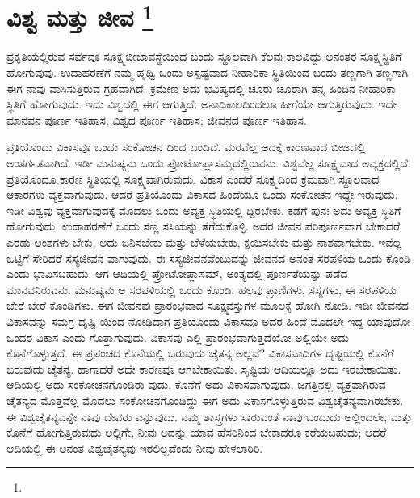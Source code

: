 
\chapter[ವಿಶ್ವ ಮತ್ತು ಜೀವ ]{ವಿಶ್ವ ಮತ್ತು ಜೀವ \protect\footnote{}}

ಪ್ರಕೃತಿಯಲ್ಲಿರುವ ಸರ್ವವೂ ಸೂಕ್ಷ್ಮಬೀಜಾವಸ್ಥೆಯಿಂದ ಬಂದು ಸ್ಥೂಲವಾಗಿ ಕೆಲವು ಕಾಲವಿದ್ದು ಅನಂತರ ಸೂಕ್ಷ್ಮಸ್ಥಿತಿಗೆ ಹೋಗುವುವು. ಉದಾಹರಣೆಗೆ ನಮ್ಮ ಪೃಥ್ವಿ ಒಂದು ಅಸ್ಪಷ್ಟವಾದ ನೀಹಾರಿಕಾ ಸ್ಥಿತಿಯಿಂದ ಬಂದು ತಣ್ಣಗಾಗಿ ತಣ್ಣಗಾಗಿ ಈಗ ನಾವು ವಾಸಿಸುತ್ತಿರುವ ಗ್ರಹವಾಗಿದೆ. ಕ್ರಮೇಣ ಅದು ಭವಿಷ್ಯದಲ್ಲಿ ಚೂರು ಚೂರಾಗಿ ತನ್ನ ಹಿಂದಿನ ನೀಹಾರಿಕಾ ಸ್ಥಿತಿಗೆ ಹೋಗುವುದು. ಇದು ವಿಶ್ವದಲ್ಲಿ ಈಗ ಆಗುತ್ತಿದೆ. ಅನಾದಿಕಾಲದಿಂದಲೂ ಹೀಗೆಯೇ ಆಗುತ್ತಿರುವುದು. ಇದೇ ಮಾನವನ ಪೂರ್ಣ ಇತಿಹಾಸ; ವಿಶ್ವದ ಪೂರ್ಣ ಇತಿಹಾಸ; ಜೀವನದ ಪೂರ್ಣ ಇತಿಹಾಸ.

ಪ್ರತಿಯೊಂದು ವಿಕಾಸವೂ ಒಂದು ಸಂಕೋಚನ  ದಿಂದ ಬಂದಿದೆ. ಮರವೆಲ್ಲ ಅದಕ್ಕೆ ಕಾರಣವಾದ ಬೀಜದಲ್ಲಿ ಅಂತರ್ಗತವಾಗಿದೆ. ಇಡೀ ಮನುಷ್ಯನು ಒಂದು ಪ್ರೋಟೋಪ್ಲಾಸಮ್ಮದಲ್ಲಿರುವನು. ವಿಶ್ವವೆಲ್ಲ ಸೂಕ್ಷ್ಮವಾದ ಅವ್ಯಕ್ತದಲ್ಲಿದೆ. ಪ್ರತಿಯೊಂದೂ ಕಾರಣ ಸ್ಥಿತಿಯಲ್ಲಿ ಸೂಕ್ಷ್ಮವಾಗಿರುವುದು. ವಿಕಾಸ ಎಂದರೆ ಸೂಕ್ಷ್ಮದಿಂದ ಕ್ರಮವಾಗಿ ಸ್ಥೂಲವಾದ ಆಕಾರಗಳು ವ್ಯಕ್ತವಾಗುವುದು. ಆದರೆ ಪ್ರತಿಯೊಂದು ವಿಕಾಸದ ಹಿಂದೆಯೂ ಒಂದು ಸಂಕೋಚನ ಇದ್ದೇ ಇರುವುದು. ಇಡೀ ವಿಶ್ವವು ವ್ಯಕ್ತವಾಗುವುದಕ್ಕೆ ಮೊದಲು ಒಂದು ಅವ್ಯಕ್ತ ಸ್ಥಿತಿಯಲ್ಲಿ ದ್ದಿರಬೇಕು. ಕಡೆಗೆ ಪುನಃ ಅದು ಅವ್ಯಕ್ತ ಸ್ಥಿತಿಗೆ ಹೋಗುವುದು. ಉದಾಹರಣೆಗೆ ಒಂದು ಸಣ್ಣ ಸಸಿಯನ್ನು ತೆಗೆದುಕೊಳ್ಳಿ. ಅದರ ಜೀವನ ಪರಿಪೂರ್ಣವಾಗ ಬೇಕಾದರೆ ಎರಡು ಅಂಶಗಳು ಬೇಕು. ಅದು ಜನಿಸಬೇಕು ಮತ್ತು ಬೆಳೆಯಬೇಕು, ಕ್ಷಯಿಸಬೇಕು ಮತ್ತು ನಾಶವಾಗಬೇಕು. ಇವೆಲ್ಲ ಒಟ್ಟಿಗೆ ಸೇರಿದರೆ ಸಸ್ಯಜೀವನ ವಾಗುವುದು. ಈ ಸಸ್ಯಜೀವನವೆಂಬುದನ್ನು ಜೀವನದ ಅನಂತ ಸರಪಳಿಯ ಒಂದು ಕೊಂಡಿ ಎಂದು ಭಾವಿಸಬಹುದು. ಆಗ ಆದಿಯಲ್ಲಿ ಪ್ರೋಟೋಪ್ಲಾಸಮ್​, ಅಂತ್ಯದಲ್ಲಿ ಪೂರ್ಣತೆಯನ್ನು ಪಡೆದ ಮಾನವನಿರುವನು. ಮನುಷ್ಯನು ಆ ಸರಪಳಿಯಲ್ಲಿ ಒಂದು ಕೊಂಡಿ. ಹಲವು ಪ್ರಾಣಿಗಳು, ಸಸ್ಯಗಳು, ಈ ಸರಪಳಿಯ ಬೇರೆ ಬೇರೆ ಕೊಂಡಿಗಳು. ಈಗ ಜೀವನವು ಪ್ರಾರಂಭವಾದ ಸೂಕ್ಷ್ಮವಸ್ತುಗಳ ಮೂಲಕ್ಕೆ ಹೋಗಿ ನೋಡಿ. ಇಡೀ ಜೀವನದ ವಿಕಾಸವನ್ನು ಸಮಗ್ರ ದೃಷ್ಟಿ ಯಿಂದ ನೋಡಿದಾಗ ಪ್ರತಿಯೊಂದು ವಿಕಾಸವೂ ಅದರ ಹಿಂದೆ ಮೊದಲೇ ಇದ್ದ ಯಾವುದೋ ಒಂದರ ವಿಕಾಸ ಎಂದು ಗೊತ್ತಾಗುವುದು. ವಿಕಾಸವು ಎಲ್ಲಿ ಪ್ರಾರಂಭವಾಗುತ್ತದೆಯೋ ಅಲ್ಲಿಯೇ ಅದು ಕೊನೆಗೊಳ್ಳುತ್ತದೆ. ಈ ಪ್ರಪಂಚದ ಕೊನೆಯಲ್ಲಿ ಬರುವುದು ಚೈತನ್ಯ ಅಲ್ಲವೆ? ವಿಕಾಸವಾದಿಗಳ ದೃಷ್ಟಿಯಲ್ಲಿ ಕೊನೆಗೆ ಬರುವುದು ಚೈತನ್ಯ. ಹಾಗಾದರೆ ಅದೇ ಕಾರಣವೂ ಆಗಬೇಕಾಯಿತು. ಸೃಷ್ಟಿಯ ಆದಿಯಲ್ಲೂ ಅದು ಇರಬೇಕಾಯಿತು. ಆದಿಯಲ್ಲಿ ಅದು ಸಂಕೋಚನಗೊಂಡಿರು ವುದು. ಕೊನೆಗೆ ಅದು ವಿಕಾಸವಾಗುವುದು. ಜಗತ್ತಿನಲ್ಲಿ ವ್ಯಕ್ತವಾಗಿರುವ ಚೈತನ್ಯದ ಮೊತ್ತವೆಲ್ಲ ಮೊದಲು ಸಂಕೋಚನಗೊಂಡಿದ್ದು ಈಗ ಅದು ವಿಕಾಸಗೊಳ್ಳುತ್ತಿರುವ ವಿಶ್ವಚೈತನ್ಯವಾಗಿರಬೇಕು. ಈ ವಿಶ್ವಚೈತನ್ಯವನ್ನೇ ನಾವು ದೇವರು ಎನ್ನುವುದು. ನಮ್ಮ ಶಾಸ್ತ್ರಗಳು ಸಾರುವಂತೆ ನಾವು ಬಂದುದು ಅಲ್ಲಿಂದಲೇ, ಮತ್ತು ಕೊನೆಗೆ ಹೋಗುತ್ತಿರುವುದು ಅಲ್ಲಿಗೇ, ನೀವು ಅದನ್ನು ಯಾವ ಹೆಸರಿನಿಂದ ಬೇಕಾದರೂ ಕರೆಯಬಹುದು; ಆದರೆ ಆದಿಯಲ್ಲಿ ಈ ಅನಂತ ವಿಶ್ವಚೈತನ್ಯವು ಇರಲಿಲ್ಲವೆಂದು ನೀವು ಹೇಳಲಾರಿರಿ.

